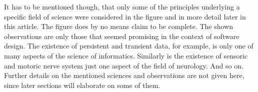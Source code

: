 It has to be mentioned though, that only some of the principles underlying a
specific field of science were considered in the figure and in more detail later
in this article. The figure does by no means claim to be complete. The shown
observations are only those that seemed promising in the context of software
design. The existence of persistent and transient data, for example, is only
one of many aspects of the science of informatics. Similarly is the existence
of sensoric and motoric nerve system just one aspect of the field of neurology.
And so on. Further details on the mentioned sciences and observations are not
given here, since later sections will elaborate on some of them.
